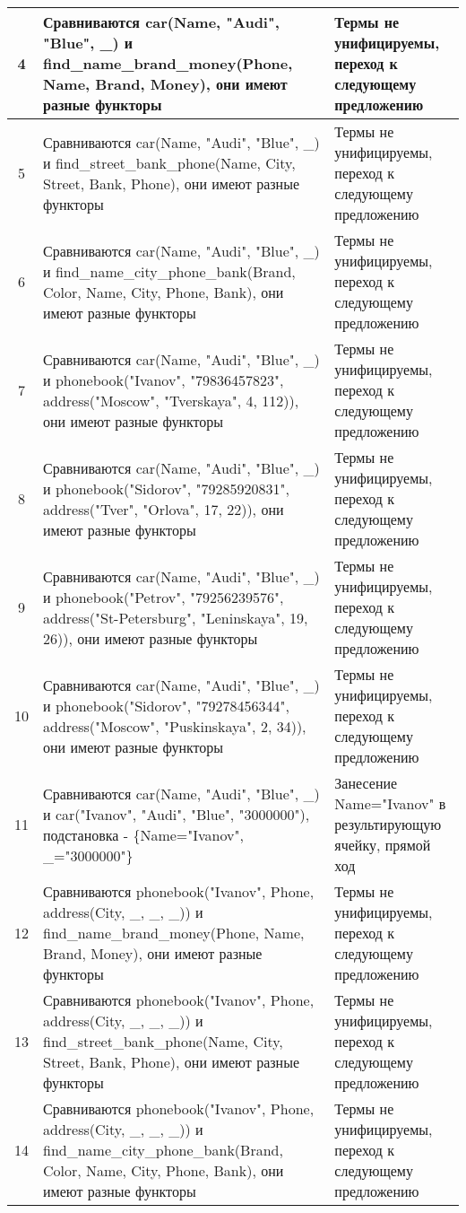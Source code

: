 \documentclass[a4paper,12pt]{article}
\begin{document}
\begin{table}[ht!] 
	\begin{tabularx}{\linewidth}{|c|>{\centering}X|>{\centering}X|}
		\hline
		4 & Сравниваются car(Name, "Audi"{}, "Blue"{}, \_) и find\_name\_brand\_money(Phone, Name, Brand, Money), они имеют разные функторы & Термы не унифицируемы, переход к следующему предложению \tabularnewline
		\hline
		5 & Сравниваются car(Name, "Audi"{}, "Blue"{}, \_) и find\_street\_bank\_phone(Name, City, Street, Bank, Phone), они имеют разные функторы & Термы не унифицируемы, переход к следующему предложению \tabularnewline
		\hline
		6 & Сравниваются car(Name, "Audi"{}, "Blue"{}, \_) и find\_name\_city\_phone\_bank(Brand, Color, Name, City, Phone, Bank), они имеют разные функторы & Термы не унифицируемы, переход к следующему предложению \tabularnewline
		\hline
		7 & Сравниваются car(Name, "Audi"{}, "Blue"{}, \_) и phonebook("Ivanov"{}, "79836457823"{}, address("Moscow"{}, "Tverskaya"{}, 4, 112)), они имеют разные функторы & Термы не унифицируемы, переход к следующему предложению \tabularnewline
		\hline
		8 & Сравниваются car(Name, "Audi"{}, "Blue"{}, \_) и phonebook("Sidorov"{}, "79285920831"{}, address("Tver"{}, "Orlova"{}, 17, 22)), они имеют разные функторы & Термы не унифицируемы, переход к следующему предложению \tabularnewline
		\hline
		9 & Сравниваются car(Name, "Audi"{}, "Blue"{}, \_) и phonebook("Petrov"{}, "79256239576"{}, address("St-Petersburg"{}, "Leninskaya"{}, 19, 26)), они имеют разные функторы & Термы не унифицируемы, переход к следующему предложению \tabularnewline
		\hline
		10 & Сравниваются car(Name, "Audi"{}, "Blue"{}, \_) и phonebook("Sidorov"{}, "79278456344"{}, address("Moscow"{}, "Puskinskaya"{}, 2, 34)), они имеют разные функторы & Термы не унифицируемы, переход к следующему предложению \tabularnewline
		\hline
		11 & Сравниваются car(Name, "Audi"{}, "Blue"{}, \_) и car("Ivanov"{}, "Audi"{}, "Blue"{}, "3000000"), подстановка - \{Name="Ivanov"{}, \_="3000000"\}& Занесение Name="Ivanov"{} в результирующую ячейку, прямой ход \tabularnewline
		\hline
		12 & Сравниваются phonebook("Ivanov"{}, Phone, address(City, \_, \_, \_)) и find\_name\_brand\_money(Phone, Name, Brand, Money), они имеют разные функторы & Термы не унифицируемы, переход к следующему предложению \tabularnewline
		\hline
		13 & Сравниваются phonebook("Ivanov"{}, Phone, address(City, \_, \_, \_)) и find\_street\_bank\_phone(Name, City, Street, Bank, Phone), они имеют разные функторы & Термы не унифицируемы, переход к следующему предложению \tabularnewline
		\hline
		14 & Сравниваются phonebook("Ivanov"{}, Phone, address(City, \_, \_, \_)) и find\_name\_city\_phone\_bank(Brand, Color, Name, City, Phone, Bank), они имеют разные функторы & Термы не унифицируемы, переход к следующему предложению \tabularnewline
		\hline
	\end{tabularx}
\end{table}
\end{document}
